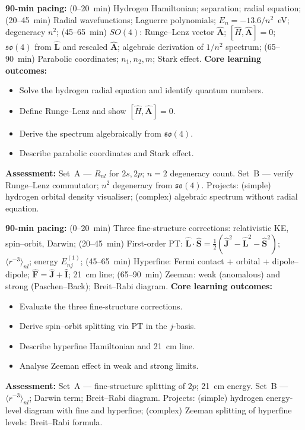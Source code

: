 \documentclass[11pt,a4paper]{article}
\begin{document}
\medskip

\begin{tcolorbox}[modulebox, title={Module~II.3 / L08: Hydrogen Atom and $SO(4)$ Symmetry}]
\textbf{90-min pacing:} (0--20~min) Hydrogen Hamiltonian; separation; radial equation; (20--45~min) Radial wavefunctions; Laguerre polynomials; $E_n=-13.6/n^2$~eV; degeneracy $n^2$; (45--65~min) $SO(4)$: Runge--Lenz vector $\hat{\mathbf{A}}$; $[\hat{H},\hat{\mathbf{A}}]=0$; $\mathfrak{so}(4)$ from $\hat{\mathbf{L}}$ and rescaled $\hat{\mathbf{A}}$; algebraic derivation of $1/n^2$ spectrum; (65--90~min) Parabolic coordinates; $n_1,n_2,m$; Stark effect.
\medskip\textbf{Core learning outcomes:}
\begin{itemize}[leftmargin=1.4em,topsep=2pt,itemsep=1pt]
  \item Solve the hydrogen radial equation and identify quantum numbers.
  \item Define Runge--Lenz and show $[\hat{H},\hat{\mathbf{A}}]=0$.
  \item Derive the spectrum algebraically from $\mathfrak{so}(4)$.
  \item Describe parabolic coordinates and Stark effect.
\end{itemize}
\medskip\textbf{Assessment:}
Set~A --- $R_{nl}$ for $2s,2p$; $n=2$ degeneracy count.
Set~B --- verify Runge--Lenz commutator; $n^2$ degeneracy from $\mathfrak{so}(4)$.
Projects: (simple) hydrogen orbital density visualiser; (complex) algebraic spectrum without radial equation.
\end{tcolorbox}

\medskip

\begin{tcolorbox}[modulebox, title={Module~II.3 / L09: Fine and Hyperfine Structure}]
\textbf{90-min pacing:} (0--20~min) Three fine-structure corrections: relativistic KE, spin--orbit, Darwin; (20--45~min) First-order PT: $\hat{\mathbf{L}}\cdot\hat{\mathbf{S}}=\tfrac{1}{2}(\hat{\mathbf{J}}^2-\hat{\mathbf{L}}^2-\hat{\mathbf{S}}^2)$; $\langle r^{-3}\rangle_{nl}$; energy $E_{nj}^{(1)}$; (45--65~min) Hyperfine: Fermi contact + orbital + dipole--dipole; $\hat{\mathbf{F}}=\hat{\mathbf{J}}+\hat{\mathbf{I}}$; 21~cm line; (65--90~min) Zeeman: weak (anomalous) and strong (Paschen--Back); Breit--Rabi diagram.
\medskip\textbf{Core learning outcomes:}
\begin{itemize}[leftmargin=1.4em,topsep=2pt,itemsep=1pt]
  \item Evaluate the three fine-structure corrections.
  \item Derive spin--orbit splitting via PT in the $j$-basis.
  \item Describe hyperfine Hamiltonian and 21~cm line.
  \item Analyse Zeeman effect in weak and strong limits.
\end{itemize}
\medskip\textbf{Assessment:}
Set~A --- fine-structure splitting of $2p$; 21~cm energy.
Set~B --- $\langle r^{-3}\rangle_{nl}$; Darwin term; Breit--Rabi diagram.
Projects: (simple) hydrogen energy-level diagram with fine and hyperfine; (complex) Zeeman splitting of hyperfine levels: Breit--Rabi formula.
\end{tcolorbox}
\end{document}
